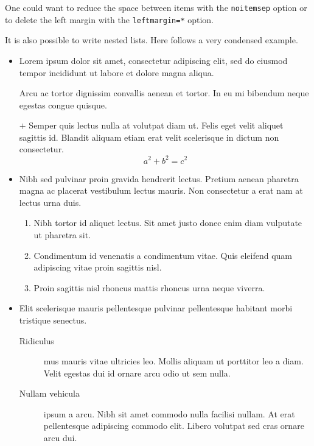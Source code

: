 \documentclass[a4paper, 12pt]{report}
\begin{document}
    One could want to reduce the space between items with the \texttt{noitemsep} option or to delete the left margin with the \texttt{leftmargin=*} option.

    It is also possible to write nested lists. Here follows a very condensed example.

    \begin{itemize}[leftmargin=*]
        \item Lorem ipsum dolor sit amet, consectetur adipiscing elit, sed do eiusmod tempor incididunt ut labore et dolore magna aliqua.

        Arcu ac tortor dignissim convallis aenean et tortor. In eu mi bibendum neque egestas congue quisque.

        \item[$+$] Semper quis lectus nulla at volutpat diam ut. Felis eget velit aliquet sagittis id. Blandit aliquam etiam erat velit scelerisque in dictum non consectetur.
        \begin{equation}
            a^2 + b^2 = c^2
        \end{equation}

        \item Nibh sed pulvinar proin gravida hendrerit lectus. Pretium aenean pharetra magna ac placerat vestibulum lectus mauris. Non consectetur a erat nam at lectus urna duis.
        \begin{enumerate}[noitemsep, label=\roman*.]
            \item Nibh tortor id aliquet lectus. Sit amet justo donec enim diam vulputate ut pharetra sit.
            \setcounter{enumi}{3}
            \item Condimentum id venenatis a condimentum vitae. Quis eleifend quam adipiscing vitae proin sagittis nisl.
            \addtocounter{enumi}{15}
            \item Proin sagittis nisl rhoncus mattis rhoncus urna neque viverra.
        \end{enumerate}

        \item Elit scelerisque mauris pellentesque pulvinar pellentesque habitant morbi tristique senectus.
            \begin{description}
                \item[Ridiculus] mus mauris vitae ultricies leo. Mollis aliquam ut porttitor leo a diam. Velit egestas dui id ornare arcu odio ut sem nulla.
                \item[Nullam vehicula] ipsum a arcu. Nibh sit amet commodo nulla facilisi nullam. At erat pellentesque adipiscing commodo elit. Libero volutpat sed cras ornare arcu dui.
            \end{description}
    \end{itemize}
\end{document}
